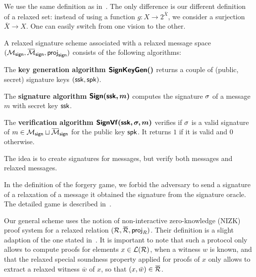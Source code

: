 
\label{sec:relaxed_signature_scheme}
	We use the same definition as in~\cite[Section 5.1]{ISC:BosCamNev18}. The 
only difference is our different definition of a relaxed set: instead of using 
a function $g: X \rightarrow 2^{\bar{X}}$, we consider a surjection $\bar{X} 
\rightarrow X$. One can easily switch from one vision to the other.

A relaxed signature scheme  associated with a relaxed message 
space $(\SetMessSign,\SetRelMessSign, \projsign)$ consists of 
the following algorithms:


\begin{compactitem}
	\item The \textbf{key generation algorithm $\bm{\mathsf{SignKeyGen}()}$} returns a 
couple of (public, secret) signature keys $(\mathsf{ssk}, \mathsf{spk})$.
	\item The \textbf{signature algorithm $\bm{\mathsf{Sign}(\mathsf{ssk}, m)}$} computes the 
signature $\sigma$ of a	message $m$ with secret key $\mathsf{ssk}$.
	\item The \textbf{verification algorithm $\bm{\mathsf{SignVf}(\mathsf{ssk}, \sigma, 
m)}$} verifies if $\sigma$ is a valid signature of $m \in \SetMessSign 
\sqcup \SetRelMessSign$ for the public key $\mathsf{spk}$. It returns $1$ if it is 
valid and $0$ otherwise.
\end{compactitem}

The idea is to create signatures for messages, but verify both messages and 
relaxed messages.
	 
In the definition of the forgery game, we forbid the adversary to send a 
signature of a relaxation of a message it obtained the signature from the signature oracle. The 
detailed game is described in~\cite[Section 5.1]{ISC:BosCamNev18}.


	Our general scheme uses the notion of non-interactive zero-knowledge 
(NIZK) proof system for a relaxed relation $(\relation,\barrelation, \proj_R)$.
Their definition is a slight adaption 
 of the one stated in~\cite[Section 3.1]{ISC:BosCamNev18}. It is 
important to note that such a protocol
only allows to compute proofs for elements $x \in \mathcal{L}(\mathcal{R})$, 
when a witness $w$ is known,
 and that the relaxed special soundness property applied for proofs of 
$x$ only allows to extract a
 relaxed witness $\bar{w}$ of $x$, so that $(x, \bar{w}) \in 
\barrelation$.

